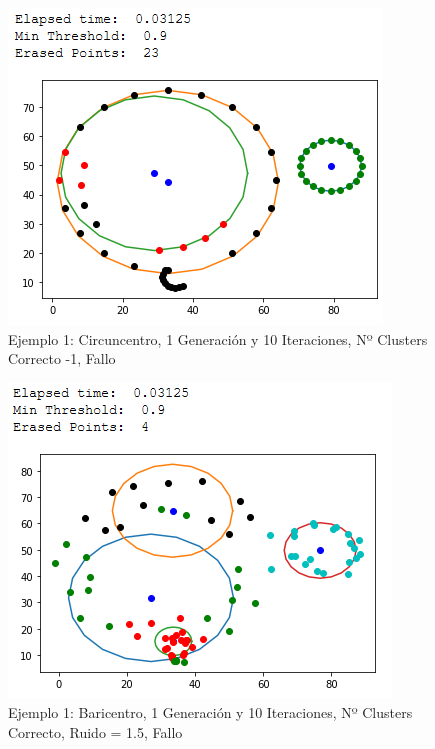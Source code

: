 \documentclass[conference,a4paper]{IEEEtran}
\begin{document}
\begin{figure}[H]
\centering
\includegraphics[scale=0.65]{Experimentacion/Ejemplo1/ej1_c_1_10_lc}
\caption{Ejemplo 1: Circuncentro, 1 Generación y 10 Iteraciones,  Nº Clusters Correcto -1, Fallo\\}
\end{figure}

\begin{figure}[H]
\centering
\includegraphics[scale=0.65]{Experimentacion/Ejemplo1/ej1_b_1_10_mr}
\caption{Ejemplo 1: Baricentro, 1 Generación y 10 Iteraciones,  Nº Clusters Correcto, Ruido = 1.5, Fallo\\}
\end{figure}
\end{document}
